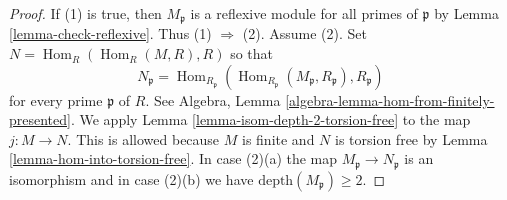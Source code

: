 \documentclass[10pt,a4paper]{amsart}
\theoremstyle{plain}
\theoremstyle{definition}
\theoremstyle{remark}
\numberwithin{equation}{subsection}
\def\Hom{\mathop{\mathrm{Hom}}\nolimits}
\begin{document}
\begin{proof}
If (1) is true, then $M_\mathfrak p$ is a reflexive module
for all primes of $\mathfrak p$ by Lemma \ref{lemma-check-reflexive}.
Thus (1) $\Rightarrow$ (2). Assume (2). Set $N = \Hom_R(\Hom_R(M, R), R)$
so that
$$
N_\mathfrak p =
\Hom_{R_\mathfrak p}(
\Hom_{R_\mathfrak p}(M_\mathfrak p, R_\mathfrak p), R_\mathfrak p)
$$
for every prime $\mathfrak p$ of $R$.
See Algebra, Lemma \ref{algebra-lemma-hom-from-finitely-presented}.
We apply Lemma \ref{lemma-isom-depth-2-torsion-free} to the map
$j : M \to N$. This is allowed because $M$ is finite and
$N$ is torsion free by Lemma \ref{lemma-hom-into-torsion-free}.
In case (2)(a) the map $M_\mathfrak p \to N_\mathfrak p$ is an
isomorphism and in case (2)(b) we have $\text{depth}(M_\mathfrak p) \geq 2$.
\end{proof}
\end{document}
